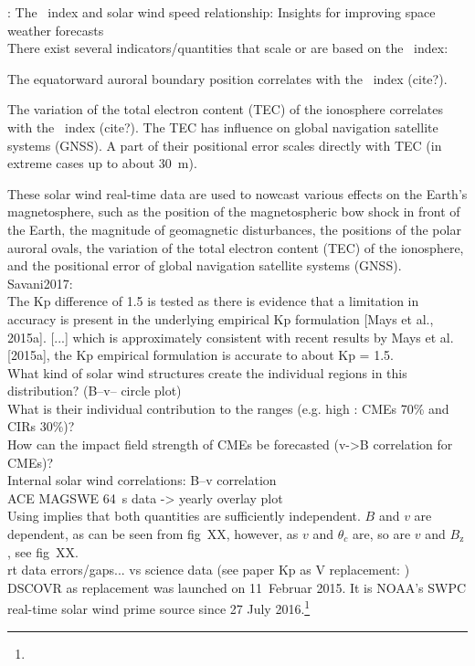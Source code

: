 \citet{Elliott2013}: The \Kp~index and solar wind speed relationship: Insights for improving space weather forecasts\\

There exist several indicators/quantities that scale or are based on the \Kp{}~index:
\begin{itemize*}
	\item The equatorward auroral boundary position correlates with the \Kp~index (cite?).
	\item The variation of the total electron content (TEC) of the ionosphere correlates with the \Kp~index (cite?). The TEC has influence on global navigation satellite systems (GNSS). A part of their positional error scales directly with TEC (in extreme cases up to about \SI{30}{\m}).
\end{itemize*}

These solar wind real-time data are used to nowcast various effects on the Earth's magnetosphere, such as the position of the magnetospheric bow shock in front of the Earth, the magnitude of geomagnetic disturbances, the positions of the polar auroral ovals, the variation of the total electron content (TEC) of the ionosphere, and the positional error of global navigation satellite systems (GNSS).\\

Savani2017:\\
The Kp difference of 1.5 is tested as there is evidence that a limitation in accuracy is present in the underlying empirical Kp formulation [Mays et al., 2015a]. [...] which is approximately consistent with recent results by Mays et al. [2015a], the Kp empirical formulation is accurate to about Kp = 1.5.\\

What kind of solar wind structures create the individual regions in this distribution? (B--v--\Kp{} circle plot)\\
What is their individual contribution to the \Kp{} ranges (e.g. high \Kp{}: CMEs 70\% and CIRs 30\%)?\\

How can the impact field strength of CMEs be forecasted (v->B correlation for CMEs)?\\
Internal solar wind correlations: B--v correlation\\
ACE MAGSWE 64~s data -> yearly overlay plot\\

Using \vBz{} implies that both quantities are sufficiently independent. $B$ and $v$ are dependent, as can be seen from fig~XX, however, as $v$ and $\theta_c$ are, so are $v$ and $B_\text{z}$, see fig~XX.\\

rt data errors/gaps... vs science data (see paper Kp as V replacement: \citet{Machol2013})\\
DSCOVR as replacement was launched on 11~Februar 2015. It is NOAA's SWPC real-time solar wind prime source since 27 July 2016.\footnote{}\\


